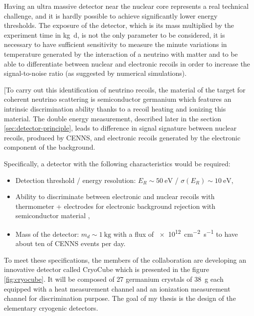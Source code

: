 Having an ultra massive detector near the nuclear core represents a real technical challenge, and it is hardly possible to achieve significantly lower energy thresholds.
The exposure of the detector, which is its mass multiplied by the experiment time in \si{\kg \day}, is not the only parameter to be considered, it is necessary to have sufficient sensitivity to measure the minute variations in temperature generated by the interaction of a neutrino with matter and to be able to differentiate between nuclear and electronic recoils in order to increase the signal-to-noise ratio (as suggested by numerical simulations). 


[To carry out this identification of neutrino recoils, the material of the target for coherent neutrino scattering is semiconductor germanium which features an intrinsic discrimination ability thanks to a recoil heating and ionizing this material. The double energy measurement, described later in the section \ref{sec:detector-principle}, leads to difference in signal signature between nuclear recoils, produced by CENNS, and electronic recoils generated by the electronic component of the background.


Specifically, a detector with the following characteristics would be required:
\begin{itemize}
	\item Detection threshold / energy resolution: $E_R \sim \SI{50}{\eV}$ / $\sigma(E_R) \sim \SI{10}{\eV}$,
	\item Ability to discriminate between electronic and nuclear recoils with thermometer + electrodes for electronic background rejection with semiconductor material ,
	\item Mass of the detector: $m_d \sim \SI{1}{\kg}$ with a flux of \SI{e12}{\cm^{-2} \s^{-1}} to have about ten of CENNS events per day.
\end{itemize}

To meet these specifications, the members of the \Ricochet{} collaboration are developing an innovative detector called CryoCube which is presented in the figure \ref{fig:cryocube}. It will be composed of 27 germanium crystals of \SI{38}{\g} each equipped with a heat measurement channel and an ionization measurement channel for discrimination purpose. The goal of my thesis is the design of the elementary cryogenic detectors.

